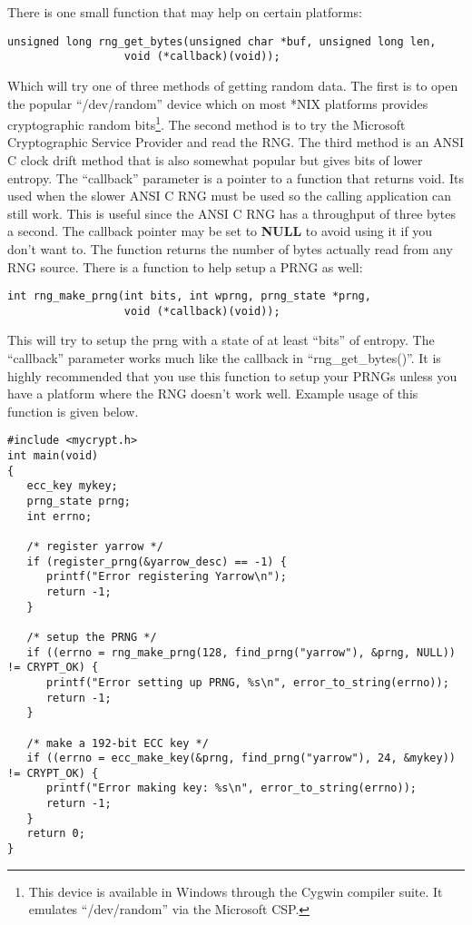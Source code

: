 \documentclass{book}
\begin{document}
There is one small function that may help on certain platforms:
\begin{verbatim}
unsigned long rng_get_bytes(unsigned char *buf, unsigned long len, 
                  void (*callback)(void));
\end{verbatim}

Which will try one of three methods of getting random data.  The first is to open the popular ``/dev/random'' device which 
on most *NIX platforms provides cryptographic random bits\footnote{This device is available in Windows through the Cygwin compiler suite.  It emulates ``/dev/random'' via the Microsoft CSP.}.  
The second method is to try the Microsoft Cryptographic Service Provider and read the RNG.  The third method is an ANSI C 
clock drift method that is also somewhat popular but gives bits of lower entropy.  The ``callback'' parameter is a pointer to a function that returns void.  Its used when the slower ANSI C RNG must be 
used so the calling application can still work.  This is useful since the ANSI C RNG has a throughput of three 
bytes a second.  The callback pointer may be set to {\bf NULL} to avoid using it if you don't want to.  The function 
returns the number of bytes actually read from any RNG source.  There is a function to help setup a PRNG as well:
\begin{verbatim}
int rng_make_prng(int bits, int wprng, prng_state *prng, 
                  void (*callback)(void));
\end{verbatim}
This will try to setup the prng with a state of at least ``bits'' of entropy.  The ``callback'' parameter works much like
the callback in ``rng\_get\_bytes()''.  It is highly recommended that you use this function to setup your PRNGs unless you have a
platform where the RNG doesn't work well.  Example usage of this function is given below.

\begin{small}
\begin{verbatim}
#include <mycrypt.h>
int main(void)
{
   ecc_key mykey;
   prng_state prng;
   int errno;

   /* register yarrow */
   if (register_prng(&yarrow_desc) == -1) {
      printf("Error registering Yarrow\n");
      return -1;
   }

   /* setup the PRNG */
   if ((errno = rng_make_prng(128, find_prng("yarrow"), &prng, NULL)) != CRYPT_OK) {
      printf("Error setting up PRNG, %s\n", error_to_string(errno));
      return -1;
   }

   /* make a 192-bit ECC key */
   if ((errno = ecc_make_key(&prng, find_prng("yarrow"), 24, &mykey)) != CRYPT_OK) {
      printf("Error making key: %s\n", error_to_string(errno));
      return -1;
   }
   return 0;
}
\end{verbatim}
\end{small}
\end{document}
